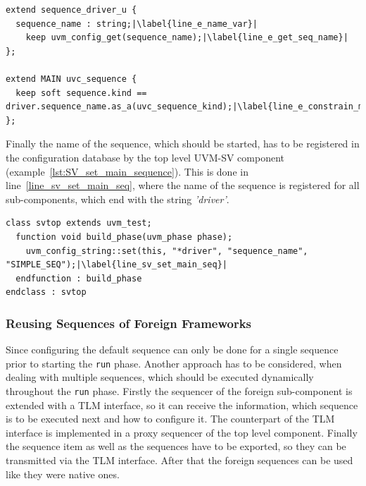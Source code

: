 \lstset{language=e, numbers = left, escapechar=|, breaklines=true}
\begin{lstlisting}[frame=htrbl, caption={\textit{e}: getting the \lstinline$main$ sequence from configuration database},
label={lst:e_get_main_sequence}]
extend sequence_driver_u {
  sequence_name : string;|\label{line_e_name_var}|
    keep uvm_config_get(sequence_name);|\label{line_e_get_seq_name}|
};

extend MAIN uvc_sequence {
  keep soft sequence.kind == driver.sequence_name.as_a(uvc_sequence_kind);|\label{line_e_constrain_main_seq}|
};
\end{lstlisting}
Finally the name of the sequence, which should be started, has to be registered in the configuration database by the top level UVM-SV component (example~\ref{lst:SV_set_main_sequence}). This is done in line~\ref{line_sv_set_main_seq}, where the name of the sequence is registered for all sub-components, which end with the string \emph{'driver'}.
\lstset{language=SystemVerilog, numbers = left, escapechar=|, breaklines=true}
\begin{lstlisting}[frame=htrbl, caption={SystemVerilog: setting the \lstinline$main$ sequence via configuration database},
label={lst:SV_set_main_sequence}]
class svtop extends uvm_test;
  function void build_phase(uvm_phase phase);
    uvm_config_string::set(this, "*driver", "sequence_name", "SIMPLE_SEQ");|\label{line_sv_set_main_seq}|
  endfunction : build_phase
endclass : svtop
\end{lstlisting}
\subsubsection{Reusing Sequences of Foreign Frameworks}
Since configuring the default sequence can only be done for a single sequence prior to starting the \lstinline$run$ phase. Another approach has to be considered, when dealing with multiple sequences, which should be executed dynamically throughout the \lstinline$run$ phase. Firstly the sequencer of the foreign sub-component is extended with a TLM interface, so it can receive the information, which sequence is to be executed next and how to configure it. The counterpart of the TLM interface is implemented in a proxy sequencer of the top level component. Finally the sequence item as well as the sequences have to be exported, so they can be transmitted via the TLM interface. After that the foreign sequences can be used like they were native ones.
